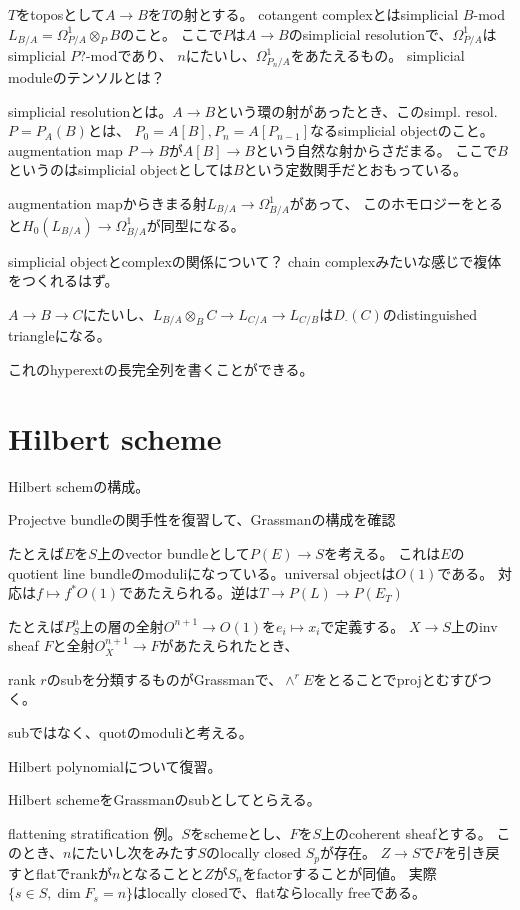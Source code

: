 \documentclass{jsarticle}
\begin{document}
\begin{dfn}
$T$をtoposとして$A \to B$を$T$の射とする。
cotangent complexとはsimplicial $B$-mod $L_{B/A}=\Omega^1_{P/A}\otimes_P B$のこと。
ここで$P$は$A \to B$のsimplicial resolutionで、$\Omega^1_{P/A}$はsimplicial $P$?-modであり、
$n$にたいし、$\Omega^1_{P_n/A}$をあたえるもの。
simplicial moduleのテンソルとは？
\end{dfn}

simplicial resolutionとは。$A\to B$という環の射があったとき、このsimpl. resol. $P=P_A(B)$とは、
$P_0 = A[B], P_n=A[P_{n-1}]$なるsimplicial objectのこと。
augmentation map $P \to B$が$A[B] \to B$という自然な射からさだまる。
ここで$B$というのはsimplicial objectとしては$B$という定数関手だとおもっている。

augmentation mapからきまる射$L_{B/A} \to \Omega^1_{B/A}$があって、
このホモロジーをとると$H_0(L_{B/A}) \to \Omega^1_{B/A}$が同型になる。

simplicial objectとcomplexの関係について？
chain complexみたいな感じで複体をつくれるはず。


\begin{prop}
$A\to B\to C$にたいし、$L_{B/A}\otimes_B C \to L_{C/A} \to L_{C/B}$は$D_\cdot(C)$のdistinguished triangleになる。
\end{prop}

これのhyperextの長完全列を書くことができる。

\section{Hilbert scheme}
Hilbert schemの構成。

Projectve bundleの関手性を復習して、Grassmanの構成を確認

たとえば$E$を$S$上のvector bundleとして$P(E)\to S$を考える。
これは$E$のquotient line bundleのmoduliになっている。universal objectは$O(1)$である。
対応は$f\mapsto f^*O(1)$であたえられる。逆は$T\to P(L)\to P(E_T)$

たとえば$P^n_S$上の層の全射$O^{n+1}\to O(1)$を$e_i\mapsto x_i$で定義する。
$X\to S$上のinv sheaf $F$と全射$O_X^{n+1}\to F$があたえられたとき、

rank $r$のsubを分類するものがGrassmanで、$\wedge^rE$をとることでprojとむすびつく。

subではなく、quotのmoduliと考える。

Hilbert polynomialについて復習。

Hilbert schemeをGrassmanのsubとしてとらえる。

flattening stratification
例。$S$をschemeとし、$F$を$S$上のcoherent sheafとする。
このとき、$n$にたいし次をみたす$S$のlocally closed $S_p$が存在。
$Z\to S$で$F$を引き戻すとflatでrankが$n$となることと$Z$が$S_n$をfactorすることが同値。
実際$\{s\in S, \dim F_s=n\}$はlocally closedで、flatならlocally freeである。
\end{document}
